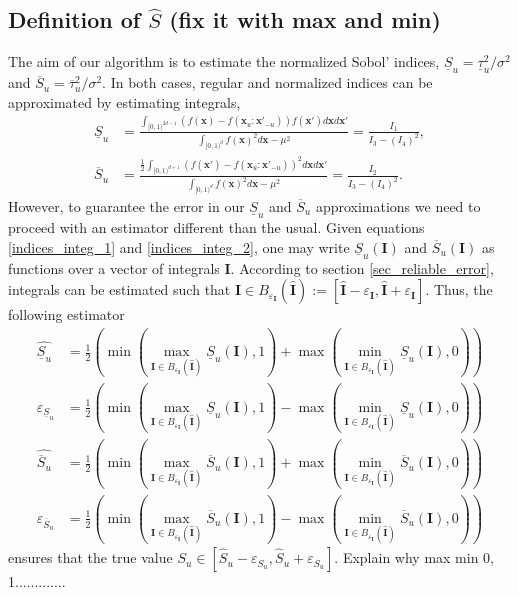 \documentclass[]{elsarticle}
\theoremstyle{definition}
\newcommand{\bvec}[1]{\boldsymbol{#1}}
\newcommand{\vx}{\bvec{x}}
\newcommand{\vI}{\bvec{I}}
\begin{document}
\subsection{Definition of $\widehat{S}$ (fix it with max and min)}

The aim of our algorithm is to estimate the normalized Sobol' indices, $\underline{S}_u = \underline{\tau}_u^2/\sigma^2$ and $\overline{S}_u = \overline{\tau}_u^2/\sigma^2$. In both cases, regular and normalized indices can be approximated by estimating integrals,
\begin{align}\label{indices_integ_1}
\underline{S}_u & = \frac{\int_{[0,1)^{2d-1}} \left(f(\vx)-
f(\vx_u:{\vx'}_{-u})\right)f(\vx')d\vx d{\vx'} }{\int_{[0,1)^{d}} f(\vx)^2 d{\vx}-\mu^2} = \frac{I_1}{I_3-(I_4)^2}, \\
\label{indices_integ_2}
\overline{S}_u & = \frac{\frac{1}{2}\int_{[0,1)^{d+1}}(f(\vx')-f(\vx_u:{\vx'}_{-u}))^2d\vx d{\vx'}}{\int_{[0,1)^{d}} f(\vx)^2 d{\vx}-\mu^2} = \frac{I_2}{I_3-(I_4)^2}.
\end{align}
However, to guarantee the error in our $\underline{S}_u$ and $\overline{S}_u$ approximations we need to proceed with an estimator different than the usual. Given equations \eqref{indices_integ_1} and \eqref{indices_integ_2}, one may write $\underline{S}_u(\vI)$ and $\overline{S}_u(\vI)$ as functions over a vector of integrals $\vI$. According to section \ref{sec_reliable_error}, integrals can be estimated such that $\vI\in B_{\varepsilon_{\vI}}(\widehat{\vI}):=[\widehat{\vI}-\varepsilon_{\vI},\widehat{\vI}+\varepsilon_{\vI} ]$. Thus, the following estimator
\begin{align*}
\widehat{\underline{S}_u} & = \frac{1}{2}\left(\min\left(\max_{\vI\in B_{\varepsilon_{\vI}}(\widehat{\vI})} \underline{S}_u(\vI),1\right) + \max\left(\min_{\vI\in B_{\varepsilon_{\vI}}(\widehat{\vI})} \underline{S}_u(\vI),0\right) \right) \\
\varepsilon_{\underline{S}_u} & = \frac{1}{2}\left(\min\left(\max_{\vI\in B_{\varepsilon_{\vI}}(\widehat{\vI})} \underline{S}_u(\vI),1\right) - \max\left(\min_{\vI\in B_{\varepsilon_{\vI}}(\widehat{\vI})} \underline{S}_u(\vI),0\right) \right)
\end{align*}
\begin{align*}
\widehat{\overline{S}_u} & = \frac{1}{2}\left(\min\left(\max_{\vI\in B_{\varepsilon_{\vI}}(\widehat{\vI})} \overline{S}_u(\vI),1\right) + \max\left(\min_{\vI\in B_{\varepsilon_{\vI}}(\widehat{\vI})} \overline{S}_u(\vI),0\right) \right) \\
\varepsilon_{\overline{S}_u} & = \frac{1}{2}\left(\min\left(\max_{\vI\in B_{\varepsilon_{\vI}}(\widehat{\vI})} \overline{S}_u(\vI),1\right) - \max\left(\min_{\vI\in B_{\varepsilon_{\vI}}(\widehat{\vI})} \overline{S}_u(\vI),0\right) \right)
\end{align*}
ensures that the true value $S_u\in [\widehat{S}_u - \varepsilon_{S_u}, \widehat{S}_u + \varepsilon_{S_u}]$. Explain why max min 0, 1.............
\end{document}
